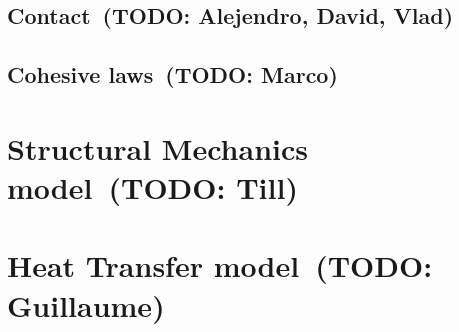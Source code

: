 \documentclass[a4paper,11pt]{book}
\newcommand{\todo}[1]{~({\small\color{red}\textbf{TODO: }\textbf{#1}})}
\begin{document}
\subsection{Contact\todo{Alejendro, David, Vlad}}

\subsection{Cohesive laws\todo{Marco}}


\section{Structural Mechanics model\todo{Till}}

\section{Heat Transfer model\todo{Guillaume}}



\end{document}
